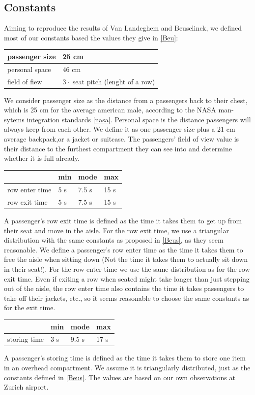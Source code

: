 \documentclass[11pt]{article}
\begin{document}
\subsection{Constants}
Aiming to reproduce the results of Van Landeghem and Beuselinck, we defined most of our constants based the values they give in \ref{Beu}:

\begin{tabular}{l|l}

	\hline
	passenger size & 25 cm \\
	\hline
	personal space & 46 cm\\
	\hline
	field of fiew & $3 \cdot$ seat pitch (lenght of a row)
\end{tabular}
	We consider passenger size as the distance from a passengers back to their chest, which is 25 cm for the average american male, according to the NASA man-sytems integration standards \ref{nasa}. Personal space is the distance passengers will always keep from each other. We define it as one passenger size plus a 21 cm average backpack,or a jacket or suitcase.
	The passengers' field of view value is their distance to the furthest compartment they can see into and determine whether it is full already.

\begin{tabular}{l|l l l}

	&min &mode&max \\
	\hline
row enter time & 5 s &7.5 s & 15 s \\
	\hline
	row exit time& 5 s &7.5 s & 15 s \\
	\hline
\end{tabular}
A passenger's row exit time is defined as the time it takes them to get up from their seat and move in the aisle. For the row exit time, we use a triangular distribution with the same constants as proposed in \ref{Beus}, as they seem reasonable. We define a passenger's row enter time as the time it takes them to free the aisle when sitting down (Not the time it takes them to actually sit down in their seat!). For the row enter time we use the same distribution as for the row exit time. Even if exiting a row when seated might take longer than just stepping out of the aisle, the row enter time also contains the time it takes passengers to take off their jackets, etc., so it seems reasonable to choose the same constants as for the exit time.

\begin{tabular}{l|l l l}

	&min &mode&max \\
	\hline
storing time & 3 s &9.5 s & 17 s \\
	\hline

	\end{tabular}
A passenger's storing time is defined as the time it takes them to store one item in an overhead compartment. We assume it is triangularly distributed, just as the constants defined in \ref{Beus}. The values are based on our own observations at Zurich airport.
\end{document}
